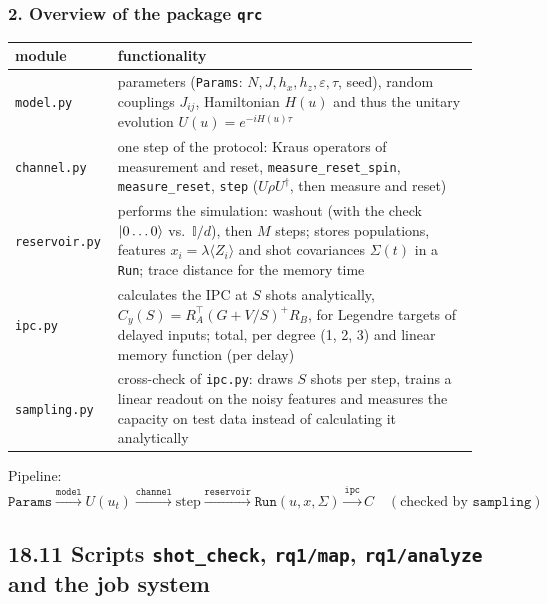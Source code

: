 \subsubsection*{2. Overview of the package \texttt{qrc}}
\begin{center}
\begin{tabular}{p{0.17\linewidth}p{0.75\linewidth}}
    \hline
    module & functionality \\
    \hline
    \texttt{model.py} & parameters (\texttt{Params}: $N, J, h_x, h_z, \varepsilon, \tau$, seed), random
    couplings $J_{ij}$, Hamiltonian $H(u)$ and thus the unitary evolution $U(u) = e^{-iH(u)\tau}$ \\
    \texttt{channel.py} & one step of the protocol: Kraus operators of measurement and reset,
    \texttt{measure\_reset\_spin}, \texttt{measure\_reset}, \texttt{step} ($U\rho U^\dagger$, then measure
    and reset) \\
    \texttt{reservoir.py} & performs the simulation: washout (with the check $\ket{0\ldots0}$ vs.\
    $\mathbb{I}/d$), then $M$ steps; stores populations, features $x_i = \lambda\langle Z_i\rangle$ and shot
    covariances $\Sigma(t)$ in a \texttt{Run}; trace distance for the memory time \\
    \texttt{ipc.py} & calculates the IPC at $S$ shots analytically,
    $C_y(S) = R_A^\top (G + V/S)^+ R_B$, for Legendre targets of delayed inputs; total, per degree
    (1, 2, 3) and linear memory function (per delay) \\
    \texttt{sampling.py} & cross-check of \texttt{ipc.py}: draws $S$ shots per step, trains a linear readout
    on the noisy features and measures the capacity on test data instead of calculating it analytically \\
    \hline
\end{tabular}
\end{center}

Pipeline:
\begin{equation*}
    \texttt{Params} \xrightarrow{\texttt{model}} U(u_t)
    \xrightarrow{\texttt{channel}} \text{step}
    \xrightarrow{\texttt{reservoir}} \texttt{Run}(u, x, \Sigma)
    \xrightarrow{\texttt{ipc}} C \quad (\text{checked by } \texttt{sampling})
\end{equation*}

\subsection*{18.11 \quad Scripts \texttt{shot\_check}, \texttt{rq1/map}, \texttt{rq1/analyze} and the job system}
\phantomsection
\label{sec:job-system}

